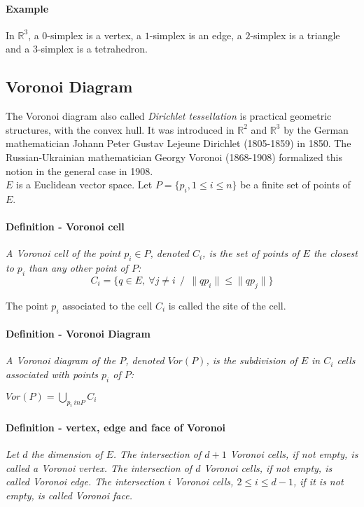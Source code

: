 \paragraph{Example}
{
In $\mathbb{R}^{3}$, a $0$-simplex is a vertex, a $1$-simplex is an edge, a $2$-simplex is a triangle and a $3$-simplex is a tetrahedron.
}


\subsection{Voronoi Diagram}

The Voronoi diagram also called {\it Dirichlet tessellation} is practical geometric structures, with the convex hull. It was introduced in  $\mathbb {R}^{2}$ and $\mathbb{R}^{3}$ by the German mathematician Johann Peter Gustav Lejeune Dirichlet (1805-1859) in 1850. The Russian-Ukrainian mathematician Georgy Voronoi (1868-1908) formalized this notion in the general case in 1908.\\

$E$ is a Euclidean vector space. Let $ P = \{p_{i}, 1 \le i \le n\} $ be a finite set of points of $E$.

\paragraph{Definition - Voronoi cell}
{
\it A Voronoi cell of the point $p_{i} \in P$, denoted $C_{i}$, is the set of points of $E$ the closest to $p_ {i}$ than any other point of $P$:
$$
C_{i} = \{q \in E,~\forall j \ne i~~/~~ \| qp_{i} \| \le \| qp_{j} \| \}
$$

The point $p_{i}$ associated to the cell $C_{i}$ is called the site of the cell.
}       

\paragraph{Definition - Voronoi Diagram}
{
\it A Voronoi diagram of the $P$, denoted $Vor (P)$, is the subdivision of $E$ in $C_{i}$ cells associated with points $p_{i}$ of $P$:

$
Vor (P) = \bigcup_{p_{i} \ in P} C_{i}
$
}

\paragraph{Definition - vertex, edge and face of Voronoi}
{
\it Let $d$ the dimension of $E$. The intersection of $d + 1$ Voronoi cells, if not empty, is called a Voronoi vertex. The intersection of $d$ Voronoi cells, if not empty, is called Voronoi edge. The intersection $i$ Voronoi cells, $ 2 \le i \le d - 1$, if it is not empty, is called Voronoi face.
}

